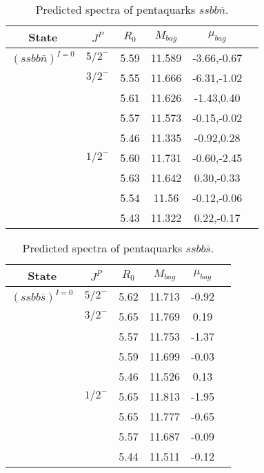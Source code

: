 \documentclass[prd,twocolumn,floatfix,nofootinbib]{revtex4}
\begin{document}
\begin{table*}[!htbp]
    \caption{Predicted spectra of pentaquarks $ssbb\bar{n}$.}
    \begin{tabular}{cccccc}
        \hline\hline
        {\rm State} &$J^{P}$ &$R_{0}$ &$M_{bag}$ &$\mu_{bag}$  \\ \hline
        ${(ssbb\bar{n})}^{I=0}$
            &${5/2}^{-}$     &5.59   &11.589 &-3.66,-0.67  \\                
            &${3/2}^{-}$     &5.55   &11.666 &-6.31,-1.02 \\
                         &$ $     &5.61   &11.626 &-1.43,0.40  \\
                         &$ $     &5.57   &11.573 &-0.15,-0.02  \\
                         &$ $     &5.46   &11.335 &-0.92,0.28 \\
            &${1/2}^{-}$     &5.60   &11.731 &-0.60,-2.45 \\
                         &$ $     &5.63   &11.642 &0.30,-0.33  \\
                         &$ $     &5.54   &11.56   &-0.12,-0.06  \\ 
                         &$ $     &5.43   &11.322 &0.22,-0.17 \\
       \hline\hline
    \end{tabular}
\end{table*}

\begin{table*}[!htbp]
    \caption{Predicted spectra of pentaquarks $ssbb\bar{s}$.}
    \begin{tabular}{cccccc}
        \hline\hline
        {\rm State} &$J^{P}$ &$R_{0}$ &$M_{bag}$ &$\mu_{bag}$  \\ \hline
        ${(ssbb\bar{s})}^{I=0}$
            &${5/2}^{-}$     &5.62   &11.713 &-0.92  \\                
            &${3/2}^{-}$     &5.65   &11.769 &0.19 \\
                         &$ $     &5.57   &11.753 &-1.37  \\
                         &$ $     &5.59   &11.699 &-0.03  \\
                         &$ $     &5.46   &11.526 &0.13 \\
            &${1/2}^{-}$     &5.65   &11.813 &-1.95  \\
                         &$ $     &5.65   &11.777 &-0.65  \\
                         &$ $     &5.57   &11.687 &-0.09  \\
                         &$ $     &5.44   &11.511 &-0.12 \\
       \hline\hline
    \end{tabular}
\end{table*}
\end{document}
